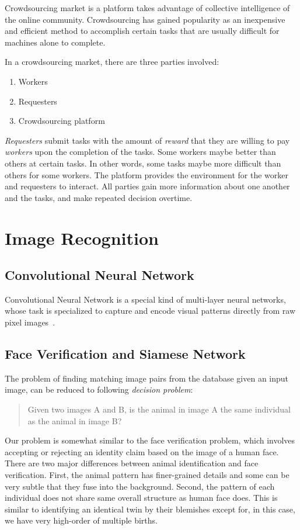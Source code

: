 Crowdsourcing market is a platform takes advantage of collective intelligence
of the online community. Crowdsourcing has gained popularity as an inexpensive
and efficient method to accomplish certain tasks that are usually difficult for
machines alone to complete.

In a crowdsourcing market, there are three parties involved:
\begin{enumerate}
	\item Workers
	\item Requesters
	\item Crowdsourcing platform
\end{enumerate}

\emph{Requesters} submit tasks with the amount of \emph{reward} that they are
willing to pay \emph{workers} upon the completion of the tasks. Some workers
maybe better than others at certain tasks. In other words, some tasks maybe
more difficult than others for some workers. The platform provides the
environment for the worker and requesters to interact. All parties gain more
information about one another and the tasks, and make repeated decision
overtime.

\section{Image Recognition}

\subsection{Convolutional Neural Network}

Convolutional Neural Network is a special kind of multi-layer neural networks,
whose task is specialized to capture and encode visual patterns directly from
raw pixel images~\cite{lecun95}.

\subsection{Face Verification and Siamese Network}

The problem of finding matching image pairs from the database given an input
image, can be reduced to following \emph{decision problem}:
\begin{quote}
\centering
Given two images A and B, is the animal in image A the same individual as the
animal in image B\@?
\end{quote}

Our problem is somewhat similar to the face verification problem, which
involves accepting or rejecting an identity claim based on the image of a human
face. There are two major differences between animal identification and face
verification. First, the animal pattern has finer-grained details and some can
be very subtle that they fuse into the background. Second, the pattern of each
individual does not share same overall structure as human face does. This is
similar to identifying an identical twin by their blemishes except for, in this
case, we have very high-order of multiple births.

